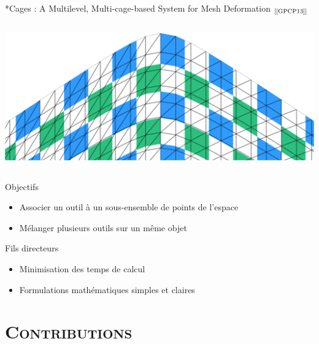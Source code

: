 \documentclass[xcolor=x11names,compress]{beamer}
\renewcommand{\(}{\begin{columns}} \renewcommand{\)}{\end{columns}}
\newcommand{\<}[1]{\begin{column}{#1}} \renewcommand{\>}{\end{column}}
\begin{document}
\begin{frame}{*Cages : A Multilevel, Multi-cage-based System for Mesh Deformation 
  $_{[\text{\cite{GPCP13}}]}$}
\begin{columns}[t]
\begin{column}{0.3\textwidth}
{\begin{minipage}{0.87\textwidth}
        \includegraphics[scale=0.15]{starCages-Boite-Avec-Pres}
      \end{minipage}}
    \end{column}
  \end{columns}
\end{frame}

\begin{frame}{Objectifs}
\begin{itemize}
  \item Associer un outil à un sous-ensemble de points de l'espace
  \item Mélanger plusieurs outils sur un même objet
\end{itemize}
  \begin{block}{Fils directeurs}
    \begin{itemize}
      \item Minimisation des temps de calcul
      \item Formulations mathématiques simples et claires
    \end{itemize}
  \end{block}
\end{frame}


\section{\scshape Contributions}
\end{document}
